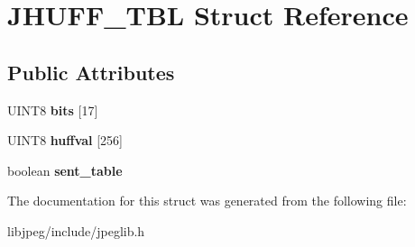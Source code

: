\hypertarget{structJHUFF__TBL}{\section{J\-H\-U\-F\-F\-\_\-\-T\-B\-L Struct Reference}
\label{structJHUFF__TBL}
}
\subsection*{Public Attributes}
\begin{DoxyCompactItemize}
\item 
\hypertarget{structJHUFF__TBL_a40e3f7adc5ead202a5ad1c46897ae97f}{U\-I\-N\-T8 {\bfseries bits} \mbox{[}17\mbox{]}}\label{structJHUFF__TBL_a40e3f7adc5ead202a5ad1c46897ae97f}

\item 
\hypertarget{structJHUFF__TBL_aef0eb814cdccd9aaa61fc73273558a05}{U\-I\-N\-T8 {\bfseries huffval} \mbox{[}256\mbox{]}}\label{structJHUFF__TBL_aef0eb814cdccd9aaa61fc73273558a05}

\item 
\hypertarget{structJHUFF__TBL_a387c655e83d0d57c50802856d630f37b}{boolean {\bfseries sent\-\_\-table}}\label{structJHUFF__TBL_a387c655e83d0d57c50802856d630f37b}

\end{DoxyCompactItemize}


The documentation for this struct was generated from the following file\-:\begin{DoxyCompactItemize}
\item 
libjpeg/include/jpeglib.\-h\end{DoxyCompactItemize}
